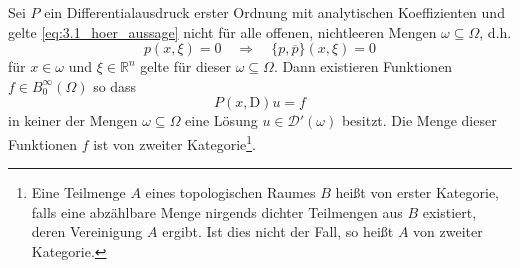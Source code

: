 \begin{thm}\label{thm:2_hoer}
Sei $P$ ein Differentialausdruck erster Ordnung mit analytischen Koeffizienten und gelte \eqref{eq:3.1_hoer_aussage} nicht für alle offenen, nichtleeren Mengen $\omega\subseteq\Omega$, d.h. 
\begin{equation}
p(x,\xi)=0 \quad\Rightarrow\quad \{p,\overline p\}(x,\xi)=0
\end{equation}
für $x\in\omega$ und $\xi\in\mathbb{R}^n$ gelte für  dieser $\omega\subseteq\Omega$.
Dann existieren Funktionen $f\in B_0^\infty(\Omega)$ so dass
\begin{equation}\label{lewy:pxDu=f}
P(x,\mathrm D)u=f
\end{equation}
in keiner der Mengen $\omega\subseteq\Omega$ eine Lösung $u\in\mathcal{D}'(\omega)$ besitzt. Die Menge dieser Funktionen $f$ ist von zweiter Kategorie\footnote{Eine Teilmenge $A$ eines topologischen Raumes $B$ heißt von erster Kategorie, falls eine abzählbare Menge nirgends dichter Teilmengen aus $B$ existiert, deren Vereinigung $A$ ergibt. Ist dies nicht der Fall, so heißt $A$ von zweiter Kategorie.}.
\end{thm}

